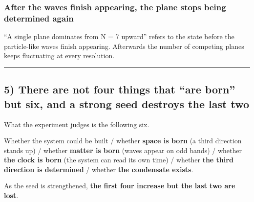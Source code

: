 \documentclass[
]{article}
\begin{document}
\subsubsection{After the waves finish appearing, the plane stops being
determined
again}\label{after-the-waves-finish-appearing-the-plane-stops-being-determined-again}

``A single plane dominates from N = 7 upward'' refers to the state
before the particle-like waves finish appearing. Afterwards the number
of competing planes keeps fluctuating at every resolution.

\begin{center}\rule{0.5\linewidth}{0.5pt}\end{center}

\subsection{5) There are not four things that ``are born'' but six, and
a strong seed destroys the last
two}\label{there-are-not-four-things-that-are-born-but-six-and-a-strong-seed-destroys-the-last-two}

What the experiment judges is the following six.

Whether the system could be built / whether \textbf{space is born} (a
third direction stands up) / whether \textbf{matter is born} (waves
appear on odd bands) / whether \textbf{the clock is born} (the system
can read its own time) / whether \textbf{the third direction is
determined} / whether \textbf{the condensate exists}.

As the seed is strengthened, \textbf{the first four increase but the
last two are lost}.
\end{document}
